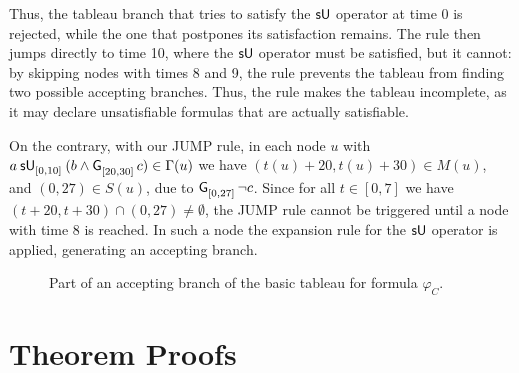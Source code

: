 \documentclass{easychair}
\begin{document}
Thus, the tableau branch that tries to satisfy the $\suntilop$ operator at time 0 is rejected, while the one that postpones its satisfaction remains.
The \oldjump{} rule then jumps directly to time 10, where the $\suntilop$ operator must be satisfied, but it cannot: by skipping nodes with times 8 and 9, the \oldjump{} rule prevents the tableau from finding two possible accepting branches.
Thus, the \oldjump{} rule makes the tableau incomplete, as it may declare unsatisfiable formulas that are actually satisfiable.

On the contrary, with our \textsf{JUMP} rule, in each node $u$ with $\suntil{[0, 10]}{a}{(b \land \glob{[20, 30]} c)} \in \Gamma(u)$ we have $(t(u)+20, t(u)+30) \in M(u)$,
and $(0,27) \in S(u)$, due to $\glob{[0, 27]} \neg c$.
Since for all $t \in [0,7]$ we have $(t+20, t+30) \cap (0,27) \neq \emptyset$,
the \textsf{JUMP} rule cannot be triggered until a node with time 8 is reached.
In such a node the expansion rule for the $\suntilop$ operator is applied, generating an accepting branch.

\begin{figure}
\centering

\caption{Part of an accepting branch of the basic tableau for formula $\varphi_C$.}
\label{fig:incomplete-tree}
\end{figure}


\section{Theorem Proofs}
\label{app:proofs}
\end{document}

